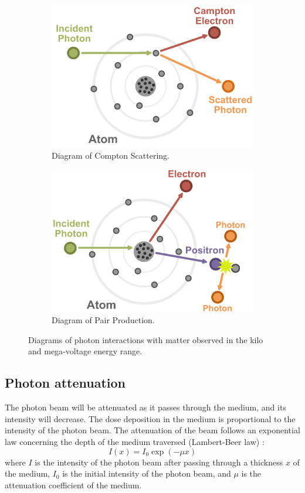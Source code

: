 \begin{figure}
\begin{subfigure}[b]{0.45\textwidth}
		\centering
		\includegraphics[width=\textwidth]{Compton_scattering.pdf}
		\caption{Diagram of Compton Scattering.}
		\label{fig:Compton_scattering}
	\end{subfigure}
	\hfill
	\begin{subfigure}[b]{0.45\textwidth}
		\centering
		\includegraphics[width=\textwidth]{pair_production.pdf}
		\caption{Diagram of Pair Production.}
		\label{fig:pair_production}
	\end{subfigure}
	\caption{Diagrams of photon interactions with matter observed in the kilo and mega-voltage energy range.}
	\label{fig:photon_interactions}
\end{figure}

\subsection{Photon attenuation}
The photon beam will be attenuated as it passes through the medium, and its intensity will decrease.
The dose deposition in the medium is proportional to the intensity of the photon beam.
The attenuation of the beam follows an exponential law concerning the depth of the medium traversed (Lambert-Beer law) \cite{Beer1852}:
$$I(x) = I_0 \exp(-\mu x)$$
where $I$ is the intensity of the photon beam after passing through a thickness $x$ of the medium,
$I_0$ is the initial intensity of the photon beam,
and $\mu$ is the attenuation coefficient of the medium.

